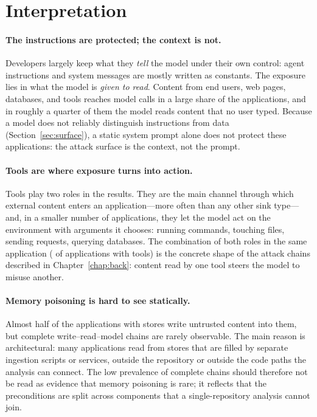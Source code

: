 \section{Interpretation}
\label{sec:disc-interpretation}

\paragraph{The instructions are protected; the context is not.} Developers largely keep what they \emph{tell} the model under their own control: agent instructions and system messages are mostly written as constants. The exposure lies in what the model is \emph{given to read}. Content from end users, web pages, databases, and tools reaches model calls in a large share of the applications, and in roughly a quarter of them the model reads content that no user typed. Because a model does not reliably distinguish instructions from data (Section~\ref{sec:surface}), a static system prompt alone does not protect these applications: the attack surface is the context, not the prompt.

\paragraph{Tools are where exposure turns into action.} Tools play two roles in the results. They are the main channel through which external content enters an application---more often than any other sink type---and, in a smaller number of applications, they let the model act on the environment with arguments it chooses: running commands, touching files, sending requests, querying databases. The combination of both roles in the same application ( of applications with tools) is the concrete shape of the attack chains described in Chapter~\ref{chap:back}: content read by one tool steers the model to misuse another.

\paragraph{Memory poisoning is hard to see statically.} Almost half of the applications with stores write untrusted content into them, but complete write--read--model chains are rarely observable. The main reason is architectural: many applications read from stores that are filled by separate ingestion scripts or services, outside the repository or outside the code paths the analysis can connect. The low prevalence of complete chains should therefore not be read as evidence that memory poisoning is rare; it reflects that the preconditions are split across components that a single-repository analysis cannot join.

